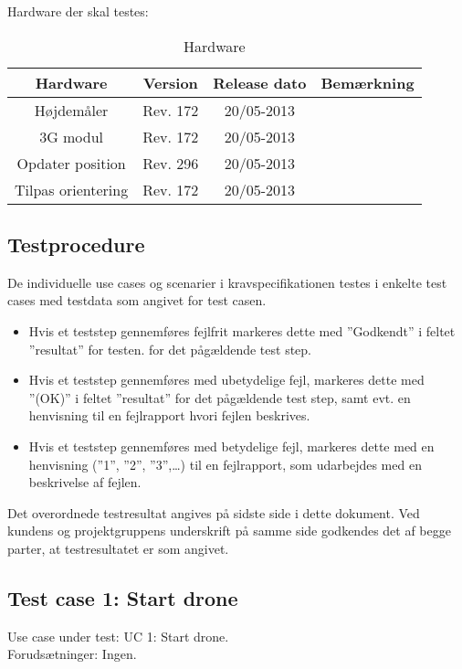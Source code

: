 Hardware der skal testes:
\begin{table}[H]
	\centering
		\begin{tabular}{|c|c|c|c|}
			\hline
			Hardware & Version & Release dato & Bemærkning \\ \hline
			Højdemåler & Rev. 172 & 20/05-2013 &  \\ \hline
			3G modul & Rev. 172 & 20/05-2013 &  \\ \hline
			Opdater position & Rev. 296 & 20/05-2013 &  \\ \hline
			Tilpas orientering & Rev. 172 & 20/05-2013 &  \\ \hline
		\end{tabular}
	\caption{Hardware}
\end{table}


\subsection*{Testprocedure}
De individuelle use cases og scenarier i kravspecifikationen testes i enkelte test cases med testdata som angivet for test casen. 

\begin{itemize}
	\item Hvis et teststep gennemføres fejlfrit markeres dette med ”Godkendt” i feltet ”resultat” for testen. for det pågældende test step.

	\item Hvis et teststep gennemføres med ubetydelige fejl, markeres dette med ”(OK)” i feltet ”resultat” for det pågældende test step, samt evt. en henvisning til en fejlrapport hvori fejlen beskrives.
	
	\item Hvis et teststep gennemføres med betydelige fejl, markeres dette med en henvisning (”1”, ”2”, ”3”,…) til en fejlrapport, som udarbejdes med en beskrivelse af fejlen.
	
\end{itemize}
Det overordnede testresultat angives på sidste side i dette dokument. Ved kundens og projektgruppens underskrift på samme side godkendes det af begge parter, at testresultatet er som angivet.

\newpage

\subsection*{Test case 1: Start drone}
Use case under test: UC 1: Start drone.\\
Forudsætninger:	Ingen.

